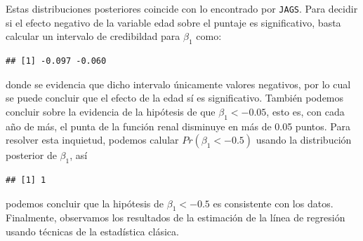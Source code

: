\begin{Eje}
Estas distribuciones posteriores coincide con lo encontrado por \verb'JAGS'. Para decidir si el efecto negativo de la variable edad sobre el puntaje es significativo, basta calcular un intervalo de credibildad para $\beta_1$ como:
\begin{knitrout}
\color{fgcolor}\begin{kframe}
\begin{alltt}
\hlstd{(}\hlstd{(}\hlstd{,}\hlstd{), bq[}\hlstd{],} \hlstd{(Bq[}\hlstd{,}\hlstd{]))}
\end{alltt}
\begin{verbatim}
## [1] -0.097 -0.060
\end{verbatim}
\end{kframe}
\end{knitrout}
donde se evidencia que dicho intervalo únicamente valores negativos, por lo cual se puede concluir que el efecto de la edad sí es significativo. También podemos concluir sobre la evidencia de la hipótesis de que $\beta_1<-0.05$, esto es, con cada año de más, el punta de la función renal disminuye en más de 0.05 puntos. Para resolver esta inquietud, podemos calular $Pr(\beta_1<-0.5)$ usando la distribución posterior de $\beta_1$, así
\begin{knitrout}
\color{fgcolor}\begin{kframe}
\begin{alltt}
\hlstd{(}\hlopt{-}\hlstd{, bq[}\hlstd{],} \hlstd{(Bq[}\hlstd{,}\hlstd{]))}
\end{alltt}
\begin{verbatim}
## [1] 1
\end{verbatim}
\end{kframe}
\end{knitrout}
podemos concluir que la hipótesis de $\beta_1<-0.5$ es consistente con los datos. Finalmente, observamos los resultados de la estimación de la línea de regresión usando técnicas de la estadística clásica.
\begin{knitrout}
\color{fgcolor}\begin{kframe}
\begin{alltt}
\hlstd{(} \hlopt{~} \hlstd{X[,}\hlstd{]))}
\end{alltt}
\begin{verbatim}

\end{verbatim}
\end{kframe}
\end{knitrout}
\end{Eje}
